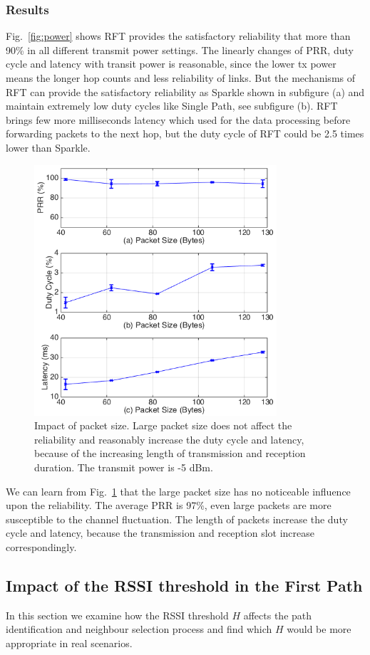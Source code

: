 \documentclass[conference]{IEEEtran}
\begin{document}
\subsubsection{Results}
Fig.~\ref{fig:power} shows RFT provides the satisfactory reliability that more than 90\% in all different transmit power settings. The linearly changes of PRR, duty cycle and latency with transit power is reasonable, since the lower tx power means the longer hop counts and less reliability of links. But the mechanisms of RFT can provide the satisfactory reliability as Sparkle shown in subfigure (a) and maintain extremely low duty cycles like Single Path, see subfigure (b). RFT brings few more milliseconds latency which used for the data processing before forwarding packets to the next hop, but the duty cycle of RFT could be 2.5 times lower than Sparkle.
\begin{figure}
\centering
\includegraphics[width=9cm]{errorbar_payload_new2.png}
\caption{Impact of packet size. Large packet size does not affect the reliability and reasonably increase the duty cycle and latency, because of the increasing length of transmission and reception duration. The transmit power is -5 dBm.}
\label{fig:payload}
\end{figure}
We can learn from Fig.~\ref{fig:payload} that the large packet size has no noticeable influence upon the reliability. The average PRR is 97\%, even large packets are more susceptible to the channel fluctuation. The length of packets increase the duty cycle and latency, because the transmission and reception slot increase correspondingly. 

\subsection{Impact of the RSSI threshold in the First Path}
\label{sec:thrssi}
In this section we examine how the RSSI threshold $H$ affects the path identification and neighbour selection process and find which $H$ would be more appropriate in real scenarios.
\end{document}
